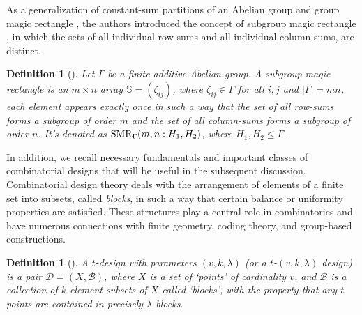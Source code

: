 \documentclass[preprint,11pt]{elsarticle}
\newcommand{\SMR}{\textnormal{SMR}}
\newtheorem{definition}[theorem]{Definition}
\begin{document}
As a generalization of constant-sum partitions of an Abelian group and group magic rectangle \cite{MR4149158}, the authors introduced the concept of subgroup magic rectangle \cite{karthik2025existence}, in which the sets of all individual row sums and all individual column sums, are distinct.

\begin{definition}[\cite{karthik2025existence}]Let $\Gamma$ be a finite additive Abelian group. A subgroup magic rectangle is an $m \times n$ array $\mathbb{S}=(\zeta_{ij})$, where $\zeta_{ij} \in \Gamma$ for all $i,j$ and $|\Gamma|=mn$, each element appears exactly once in such a way that the set of all row-sums forms a subgroup of order $m$ and the set of all column-sums forms a subgroup of order $n$. It's denoted as $\SMR_{\Gamma}(m,n : H_1, H_2)$, where $H_1, H_2 \le \Gamma$.
\end{definition}

In addition, we recall necessary fundamentals and important classes of combinatorial designs that will be useful in the subsequent discussion. 
Combinatorial design theory deals with the arrangement of elements of a finite set into subsets, called \emph{blocks}, in such a way that certain balance or uniformity properties are satisfied. 
These structures play a central role in combinatorics and have numerous connections with finite geometry, coding theory, and group-based constructions.

\begin{definition}[\cite{zbMATH00050655}]
A $t$-design with parameters $(v,k,\lambda)$ (or a $t$-$(v,k,\lambda)$ design) is a pair 
$\mathcal{D}=(X,\mathcal{B})$, where $X$ is a set of `points' of cardinality $v$, and 
$\mathcal{B}$ is a collection of $k$-element subsets of $X$ called `blocks', with the 
property that any $t$ points are contained in precisely $\lambda$ blocks.\end{definition}
\end{document}
